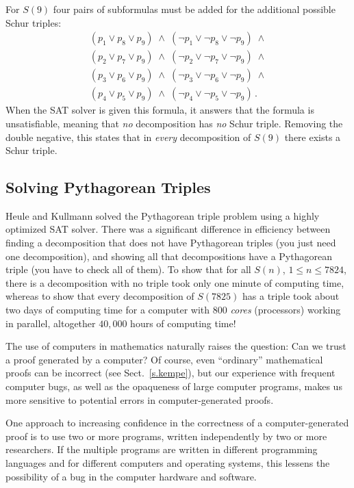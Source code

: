 \newpage

For $S(9)$ four pairs of subformulas must be added for the additional possible Schur triples:
\[
\begin{array}{l}
(p_1 \vee p_8 \vee p_9) \;\wedge\; (\neg p_1 \vee \neg p_8 \vee \neg p_9) \;\wedge \\
(p_2 \vee p_7 \vee p_9) \;\wedge\; (\neg p_2 \vee \neg p_7 \vee \neg p_9) \;\wedge \\
(p_3 \vee p_6 \vee p_9) \;\wedge\; (\neg p_3 \vee \neg p_6 \vee \neg p_9) \;\wedge \\
(p_4 \vee p_5 \vee p_9) \;\wedge\; (\neg p_4 \vee \neg p_5 \vee \neg p_9)\,.
\end{array}
\]
When the SAT solver is given this formula, it answers that the formula is unsatisfiable, meaning that \emph{no} decomposition has \emph{no} Schur triple. Removing the double negative, this states that in \emph{every} decomposition of $S(9)$ there exists a Schur triple.

\subsection{Solving Pythagorean Triples}

Heule and Kullmann solved the Pythagorean triple problem using a highly optimized SAT solver. There was a significant difference in efficiency between finding a decomposition that does not have Pythagorean triples (you just need one decomposition), and showing all that decompositions have a Pythagorean triple (you have to check all of them). To show that for all $S(n)$, $1\leq n\leq 7824$, there is a decomposition with no triple took only one minute of computing time, whereas to show that every decomposition of $S(7825)$ has a triple took about two days of computing time for a computer with $800$ \emph{cores} (processors) working in parallel, altogether $40,000$ hours of computing time!

The use of computers in mathematics naturally raises the question: Can we trust a proof generated by a computer? Of course, even ``ordinary'' mathematical proofs can be incorrect (see Sect.~\ref{s.kempe}), but our experience with frequent computer bugs, as well as the opaqueness of large computer programs, makes us more sensitive to potential errors in computer-generated proofs.

One approach to increasing confidence in the correctness of a computer-generated proof is to use two or more programs, written independently by two or more researchers. If the multiple programs are written in different programming languages and for different computers and operating systems, this lessens the possibility of a bug in the computer hardware and software.

